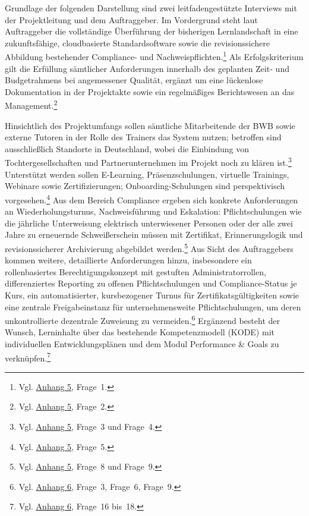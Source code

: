 \documentclass[
    12pt, 
    a4paper,
    ]{scrartcl} %
\begin{document}
Grundlage der folgenden Darstellung sind zwei leitfadengestützte Interviews mit der Projektleitung und dem Auftraggeber. Im Vordergrund steht laut Auftraggeber die vollständige Überführung der bisherigen Lernlandschaft in eine zukunftsfähige, cloudbasierte Standardsoftware sowie die revisionssichere Abbildung bestehender Compliance- und Nachweispflichten.\footnote{Vgl. \hyperref[sec:Anhang5]{Anhang 5}, Frage~1.} Als Erfolgskriterium gilt die Erfüllung sämtlicher Anforderungen innerhalb des geplanten Zeit- und Budgetrahmens bei angemessener Qualität, ergänzt um eine lückenlose Dokumentation in der Projektakte sowie ein regelmäßiges Berichtswesen an das Management.\footnote{Vgl. \hyperref[sec:Anhang5]{Anhang 5}, Frage~2.}

Hinsichtlich des Projektumfangs sollen sämtliche Mitarbeitende der BWB sowie externe Tutoren in der Rolle des Trainers das System nutzen; betroffen sind ausschließlich Standorte in Deutschland, wobei die Einbindung von Tochtergesellschaften und Partnerunternehmen im Projekt noch zu klären ist.\footnote{Vgl. \hyperref[sec:Anhang5]{Anhang 5}, Frage~3 und Frage~4.} Unterstützt werden sollen E-Learning, Präsenzschulungen, virtuelle Trainings, Webinare sowie Zertifizierungen; Onboarding-Schulungen sind perspektivisch vorgesehen.\footnote{Vgl. \hyperref[sec:Anhang5]{Anhang 5}, Frage~5.}
Aus dem Bereich Compliance ergeben sich konkrete Anforderungen an Wiederholungsturnus, Nachweisführung und Eskalation: Pflichtschulungen wie die jährliche Unterweisung elektrisch unterwiesener Personen oder der alle zwei Jahre zu erneuernde Schweißerschein müssen mit Zertifikat, Erinnerungslogik und revisionssicherer Archivierung abgebildet werden.\footnote{Vgl. \hyperref[sec:Anhang5]{Anhang 5}, Frage~8 und Frage~9.} Aus Sicht des Auftraggebers kommen weitere, detaillierte Anforderungen hinzu, insbesondere ein rollenbasiertes Berechtigungskonzept mit gestuften Administratorrollen, differenziertes Reporting zu offenen Pflichtschulungen und Compliance-Status je Kurs, ein automatisierter, kursbezogener Turnus für Zertifikatsgültigkeiten sowie eine zentrale Freigabeinstanz für unternehmensweite Pflichtschulungen, um deren unkontrollierte dezentrale Zuweisung zu vermeiden.\footnote{Vgl. \hyperref[sec:Anhang6]{Anhang 6}, Frage~3, Frage~6, Frage~9.} Ergänzend besteht der Wunsch, Lerninhalte über das bestehende Kompetenzmodell (KODE) mit individuellen Entwicklungsplänen und dem Modul Performance \& Goals zu verknüpfen.\footnote{Vgl. \hyperref[sec:Anhang6]{Anhang 6}, Frage~16 bis~18.}

\end{document}
